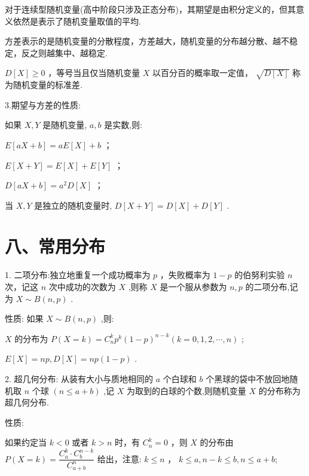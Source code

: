   对于连续型随机变量(高中阶段只涉及正态分布)，其期望是由积分定义的，但其意义依然是表示了随机变量取值的平均.

   方差表示的是随机变量的分散程度，方差越大，随机变量的分布越分散、越不稳定，反之则越集中、越稳定.

   $D\left\lbrack  X\right\rbrack   \geq  0$ ，等号当且仅当随机变量 $X$ 以百分百的概率取一定值， $\sqrt{D\left\lbrack  X\right\rbrack  }$ 称为随机变量的标准差.

3.期望与方差的性质:

如果 $X,Y$ 是随机变量, $a,b$ 是实数,则:

   $E\left\lbrack  {{aX} + b}\right\rbrack   = {aE}\left\lbrack  X\right\rbrack   + b$ ；

   $E\left\lbrack  {X + Y}\right\rbrack   = E\left\lbrack  X\right\rbrack   + E\left\lbrack  Y\right\rbrack$ ；

   $D\left\lbrack  {{aX} + b}\right\rbrack   = {a}^{2}D\left\lbrack  X\right\rbrack$ ；

   当 $X,Y$ 是独立的随机变量时, $D\left\lbrack  {X + Y}\right\rbrack   = D\left\lbrack  X\right\rbrack   + D\left\lbrack  Y\right\rbrack$ .

\section*{八、常用分布}

1. 二项分布:独立地重复一个成功概率为 $p$ ，失败概率为 $1 - p$ 的伯努利实验 $n$ 次，记这 $n$ 次中成功的次数为 $X$ ,则称 $X$ 是一个服从参数为 $n,p$ 的二项分布,记为 $X \sim  B\left( {n,p}\right)$ .

性质: 如果 $X \sim  B\left( {n,p}\right)$ ,则:

   $X$ 的分布为 $P\left( {X = k}\right)  = {{C}}_{n}^{k}{p}^{k}{\left( 1 - p\right) }^{n - k}\left( {k = 0,1,2,\cdots ,n}\right)$ ;

   $E\left\lbrack  X\right\rbrack   = {np},D\left\lbrack  X\right\rbrack   = {np}\left( {1 - p}\right)$ .

2. 超几何分布: 从装有大小与质地相同的 $a$ 个白球和 $b$ 个黑球的袋中不放回地随机取 $n$ 个球 $(n \leq  a +  b)$ ,记 $X$ 为取到的白球的个数,则随机变量 $X$ 的分布称为超几何分布.

性质:

  如果约定当 $k < 0$ 或者 $k > n$ 时，有 ${{C}}_{n}^{k} = 0$ ，则 $X$ 的分布由 $P\left( {X = k}\right)  = \dfrac{{{C}}_{a}^{k} \cdot  {{C}}_{b}^{n - k}}{{{C}}_{a + b}^{n}}$ 给出，注意: $k \leq  n$ ， $k \leq  a,n - k \leq  b,n \leq  a + b;$

